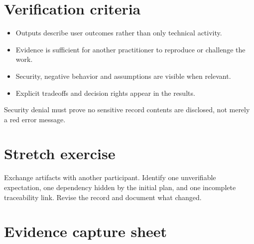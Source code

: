 \documentclass[11pt,letterpaper]{article}
\begin{document}
\section{Verification criteria}
\begin{itemize}[leftmargin=*,itemsep=2pt]
\item Outputs describe user outcomes rather than only technical activity.
\item Evidence is sufficient for another practitioner to reproduce or challenge the work.
\item Security, negative behavior and assumptions are visible when relevant.
\item Explicit tradeoffs and decision rights appear in the results.
\end{itemize}
\begin{tcolorbox}[colback=amberback,colframe=navy,title={Instructor note / expected reasoning},breakable]
Security denial must prove no sensitive record contents are disclosed, not merely a red error message.

\end{tcolorbox}
\section{Stretch exercise}
Exchange artifacts with another participant. Identify one unverifiable expectation, one dependency hidden by the initial plan, and one incomplete traceability link. Revise the record and document what changed.

\section{Evidence capture sheet}
\end{document}
